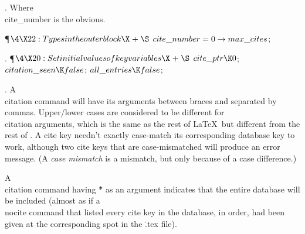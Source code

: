 .
Where \\{cite\_number} is the obvious.

\Y\P$\4\X22:Types in the outer block\X\mathrel{+}\S$\6
$\\{cite\_number}=0\to\\{max\_cites}$;\par
\fi

.
\Y\P$\4\X20:Set initial values of key variables\X\mathrel{+}\S$\6
$\\{cite\_ptr}\K0$;\6
$\\{citation\_seen}\K\\{false}$;\6
$\\{all\_entries}\K\\{false}$;\par
\fi

.
A \.{\\citation} command will have its arguments between braces and
separated by commas.  Upper/lower cases are considered to be different
for \.{\\citation} arguments, which is the same as the rest of \LaTeX\
but different from the rest of \BibTeX.  A cite key needn't exactly
case-match its corresponding database key to work, although two cite
keys that are case-mismatched will produce an error message.
(A {\sl case mismatch\/} is a mismatch, but only because of a case
difference.)

A \.{\\citation} command having \.{*} as an argument indicates that
the entire database will be included (almost as if a \.{\\nocite}
command that listed every cite key in the database, in order, had been
given at the corresponding spot in the \.{.tex} file).

